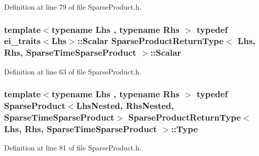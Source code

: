 Definition at line 79 of file Sparse\-Product.\-h.

\hypertarget{struct_sparse_product_return_type_3_01_lhs_00_01_rhs_00_01_sparse_time_sparse_product_01_4_a2289d55762c6c97f479a08596a6f4f0e}{
\subsubsection[{Scalar}]{\setlength{\rightskip}{0pt plus 5cm}template$<$typename Lhs , typename Rhs $>$ typedef {\bf ei\-\_\-traits}$<$Lhs$>$\-::{\bf Scalar} {\bf Sparse\-Product\-Return\-Type}$<$ Lhs, Rhs, {\bf Sparse\-Time\-Sparse\-Product} $>$\-::{\bf Scalar}}}\label{struct_sparse_product_return_type_3_01_lhs_00_01_rhs_00_01_sparse_time_sparse_product_01_4_a2289d55762c6c97f479a08596a6f4f0e}


Definition at line 63 of file Sparse\-Product.\-h.

\hypertarget{struct_sparse_product_return_type_3_01_lhs_00_01_rhs_00_01_sparse_time_sparse_product_01_4_a5ea95e31b214512f0ecc2ad2fcabe22d}{
\subsubsection[{Type}]{\setlength{\rightskip}{0pt plus 5cm}template$<$typename Lhs , typename Rhs $>$ typedef {\bf Sparse\-Product}$<${\bf Lhs\-Nested}, {\bf Rhs\-Nested}, {\bf Sparse\-Time\-Sparse\-Product}$>$ {\bf Sparse\-Product\-Return\-Type}$<$ Lhs, Rhs, {\bf Sparse\-Time\-Sparse\-Product} $>$\-::{\bf Type}}}\label{struct_sparse_product_return_type_3_01_lhs_00_01_rhs_00_01_sparse_time_sparse_product_01_4_a5ea95e31b214512f0ecc2ad2fcabe22d}


Definition at line 81 of file Sparse\-Product.\-h.



